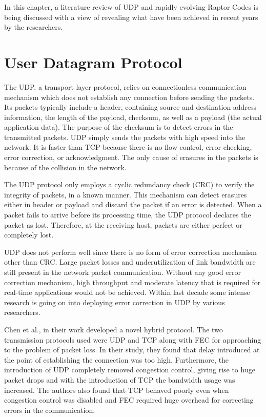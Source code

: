 
In this chapter, a literature review of UDP and rapidly evolving Raptor Codes is being discussed with a view of revealing what have been achieved in recent years by the researchers.
\section{User Datagram Protocol}
The UDP, a transport layer protocol, relies on connectionless communication mechanism which does not establish any connection before sending the packets. Its packets typically include a header, containing source and destination address information, the length of the payload, checksum, as well as a payload (the actual application data). The purpose of the checksum is to detect errors in the transmitted packets. UDP simply sends the packets with high speed into the network. It is faster than TCP because there is no flow control, error checking, error correction, or acknowledgment. The only cause of erasures in the packets is because of the collision in the network.
\par
The UDP protocol only employs a cyclic redundancy check (CRC) to verify the integrity of packets, in a known manner. This mechanism can detect erasures either in header or payload and discard the packet if an error is detected. When a packet fails to arrive before its processing time, the UDP protocol declares the packet as lost. Therefore, at the receiving host, packets are either perfect or completely lost.
\par
UDP does not perform well since there is no form of error correction mechanism other than CRC. Large packet losses and underutilization of link bandwidth are still present in the network packet communication. Without any good error correction mechanism, high throughput and moderate latency that is required for real-time applications would not be achieved. Within last decade some intense research is going on into deploying error correction in UDP by various researchers.
\par
Chen et al.,\cite{chen2005hybrid} in their work developed a novel hybrid protocol. The two transmission protocols used were UDP and TCP along with FEC for approaching to the problem of packet loss. In their study, they found that delay introduced at the point of establishing the connection was too high. Furthermore, the introduction of UDP completely removed congestion control, giving rise to huge packet drops and with the introduction of TCP the bandwidth usage was increased. The authors also found that TCP behaved poorly even when congestion control was disabled and FEC required huge overhead for correcting errors in the communication.
